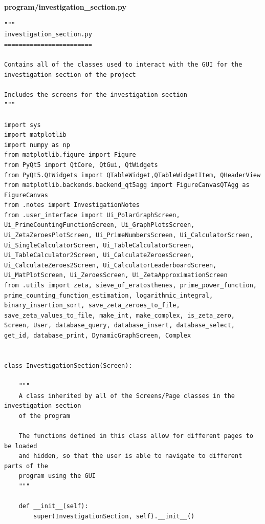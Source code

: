 \documentclass{article}
\begin{document}
\textbf{program/investigation\_section.py}

\begin{lstlisting}
"""
investigation_section.py
========================

Contains all of the classes used to interact with the GUI for the
investigation section of the project

Includes the screens for the investigation section
"""

import sys
import matplotlib
import numpy as np
from matplotlib.figure import Figure
from PyQt5 import QtCore, QtGui, QtWidgets
from PyQt5.QtWidgets import QTableWidget,QTableWidgetItem, QHeaderView
from matplotlib.backends.backend_qt5agg import FigureCanvasQTAgg as FigureCanvas
from .notes import InvestigationNotes
from .user_interface import Ui_PolarGraphScreen, Ui_PrimeCountingFunctionScreen, Ui_GraphPlotsScreen, Ui_ZetaZeroesPlotScreen, Ui_PrimeNumbersScreen, Ui_CalculatorScreen, Ui_SingleCalculatorScreen, Ui_TableCalculatorScreen, Ui_TableCalculator2Screen, Ui_CalculateZeroesScreen, Ui_CalculateZeroes2Screen, Ui_CalculatorLeaderboardScreen, Ui_MatPlotScreen, Ui_ZeroesScreen, Ui_ZetaApproximationScreen
from .utils import zeta, sieve_of_eratosthenes, prime_power_function, prime_counting_function_estimation, logarithmic_integral, binary_insertion_sort, save_zeta_zeroes_to_file, save_zeta_values_to_file, make_int, make_complex, is_zeta_zero, Screen, User, database_query, database_insert, database_select, get_id, database_print, DynamicGraphScreen, Complex


class InvestigationSection(Screen):

    """
    A class inherited by all of the Screens/Page classes in the investigation section
    of the program

    The functions defined in this class allow for different pages to be loaded
    and hidden, so that the user is able to navigate to different parts of the
    program using the GUI
    """

    def __init__(self):
        super(InvestigationSection, self).__init__()


\end{lstlisting}
\end{document}
